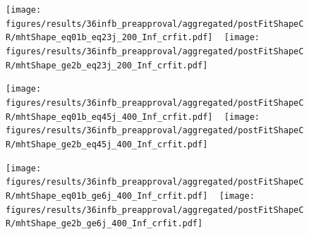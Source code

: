 \begin{figure}[h!]
  \centering
  \caption{
  }
  \texttt{[image: figures/results/36infb\_preapproval/aggregated/postFitShapeCR/mhtShape\_eq01b\_eq23j\_200\_Inf\_crfit.pdf]} ~
  \texttt{[image: figures/results/36infb\_preapproval/aggregated/postFitShapeCR/mhtShape\_ge2b\_eq23j\_200\_Inf\_crfit.pdf]} 
  \label{fig:aggregated_results2}
\end{figure}

\begin{figure}[h!]
  \centering
  \caption{
  }
  \texttt{[image: figures/results/36infb\_preapproval/aggregated/postFitShapeCR/mhtShape\_eq01b\_eq45j\_400\_Inf\_crfit.pdf]} ~
  \texttt{[image: figures/results/36infb\_preapproval/aggregated/postFitShapeCR/mhtShape\_ge2b\_eq45j\_400\_Inf\_crfit.pdf]} 
  \label{fig:aggregated_results3}
\end{figure}

\begin{figure}[h!]
  \centering
    \caption{
    }
  \texttt{[image: figures/results/36infb\_preapproval/aggregated/postFitShapeCR/mhtShape\_eq01b\_ge6j\_400\_Inf\_crfit.pdf]} ~
  \texttt{[image: figures/results/36infb\_preapproval/aggregated/postFitShapeCR/mhtShape\_ge2b\_ge6j\_400\_Inf\_crfit.pdf]}
  \label{fig:aggregated_results4}
\end{figure}
